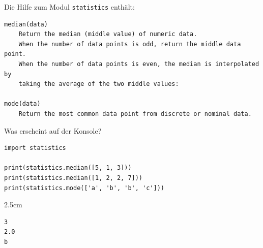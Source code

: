 \question[3]
Die Hilfe zum Modul \texttt{statistics} enthält:
\begin{lstlisting}[language={}]
median(data)
    Return the median (middle value) of numeric data.
    When the number of data points is odd, return the middle data point.
    When the number of data points is even, the median is interpolated by
    taking the average of the two middle values:

mode(data)
    Return the most common data point from discrete or nominal data.
\end{lstlisting}
Was erscheint auf der Konsole?
\begin{lstlisting}
import statistics

print(statistics.median([5, 1, 3]))
print(statistics.median([1, 2, 2, 7]))
print(statistics.mode(['a', 'b', 'b', 'c']))
\end{lstlisting}
\begin{solutionbox}{2.5cm}
\begin{lstlisting}[language={}]
3
2.0
b
\end{lstlisting}
\end{solutionbox}
